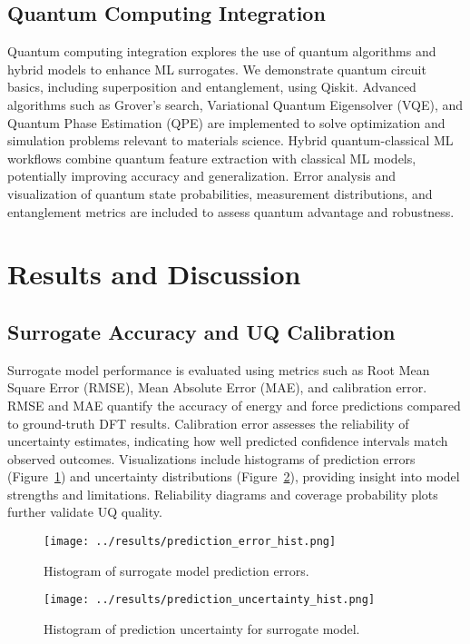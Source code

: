 \documentclass[12pt]{article}
\begin{document}
\subsection{Quantum Computing Integration}
Quantum computing integration explores the use of quantum algorithms and hybrid models to enhance ML surrogates. We demonstrate quantum circuit basics, including superposition and entanglement, using Qiskit. Advanced algorithms such as Grover's search, Variational Quantum Eigensolver (VQE), and Quantum Phase Estimation (QPE) are implemented to solve optimization and simulation problems relevant to materials science. Hybrid quantum-classical ML workflows combine quantum feature extraction with classical ML models, potentially improving accuracy and generalization. Error analysis and visualization of quantum state probabilities, measurement distributions, and entanglement metrics are included to assess quantum advantage and robustness.

\section{Results and Discussion}
\subsection{Surrogate Accuracy and UQ Calibration}

Surrogate model performance is evaluated using metrics such as Root Mean Square Error (RMSE), Mean Absolute Error (MAE), and calibration error. RMSE and MAE quantify the accuracy of energy and force predictions compared to ground-truth DFT results. Calibration error assesses the reliability of uncertainty estimates, indicating how well predicted confidence intervals match observed outcomes. Visualizations include histograms of prediction errors (Figure~\ref{fig:prediction_error_hist}) and uncertainty distributions (Figure~\ref{fig:prediction_uncertainty_hist}), providing insight into model strengths and limitations. Reliability diagrams and coverage probability plots further validate UQ quality.

\begin{figure}[h!]
    \centering
    \texttt{[image: ../results/prediction\_error\_hist.png]}
    \caption{Histogram of surrogate model prediction errors.}
    \label{fig:prediction_error_hist}
\end{figure}

\begin{figure}[h!]
    \centering
    \texttt{[image: ../results/prediction\_uncertainty\_hist.png]}
    \caption{Histogram of prediction uncertainty for surrogate model.}
    \label{fig:prediction_uncertainty_hist}
\end{figure}
\end{document}
